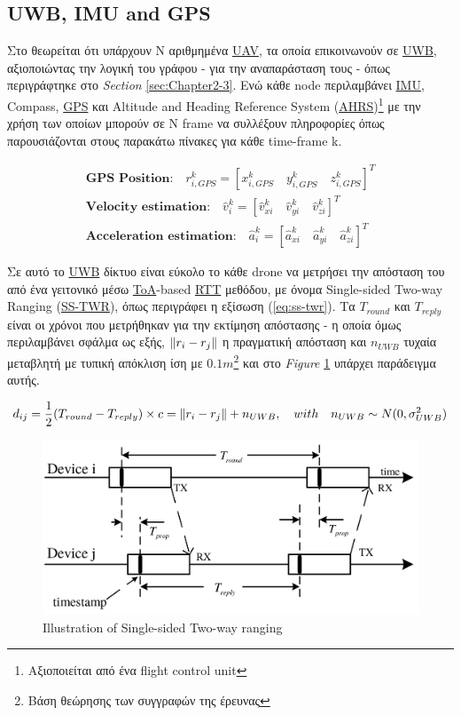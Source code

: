

\subsection{UWB, IMU and GPS}
Στο \cite{uwb-imu-gps1} θεωρείται ότι υπάρχουν Ν αριθμημένα \hyperref[abbr:UAV]{UAV}, τα οποία επικοινωνούν σε \hyperref[abbr:UWB]{UWB}, 
αξιοποιώντας την λογική του γράφου - για την αναπαράσταση τους - όπως 
περιγράφτηκε στο \emph{Section} \ref{sec:Chapter2-3}. Ενώ κάθε node περιλαμβάνει \hyperref[abbr:IMU]{IMU}, Compass, \hyperref[abbr:GPS]{GPS} και A\-lti\-tu\-de and Heading Re\-fe\-re\-nce 
System (\hyperref[abbr:AHRS]{AHRS})\footnote{Αξιοποιείται από ένα flight control unit} με την χρήση των οποίων μπορούν σε N frame να συλλέξουν 
πληροφορίες όπως παρουσιάζονται στους πα\-ρα\-κά\-τω πίνακες για κάθε time-frame k.

\begin{gather*}
	\textbf{GPS Position:}\quad r^k_{i, GPS} = \left[x^k_{i, GPS} \quad y^k_{i, GPS} \quad z^k_{i, GPS}\right]^T \\
	\textbf{Velocity estimation:}\quad\hat{v}^k_i = \left[\hat{v}^k_{xi} \quad \hat{v}^k_{yi} \quad \hat{v}^k_{zi}\right]^T \\
	\textbf{Acceleration estimation:}\quad\hat{a}^k_i = \left[\hat{a}^k_{xi} \quad \hat{a}^k_{yi} \quad \hat{a}^k_{zi}\right]^T
\end{gather*}

Σε αυτό το \hyperref[abbr:UWB]{UWB} δίκτυο είναι εύκολο το κάθε drone να μετρήσει την απόσταση του από ένα γειτονικό
μέσω \hyperref[abbr:ToA]{ToA}-based \hyperref[abbr:RTT]{RTT} μεθόδου, με όνομα Single-sided Two-way Ranging (\hyperref[abbr:SS-TWR]{SS-TWR}),
όπως περιγράφει η εξίσωση (\ref{eq:ss-twr}). Τα $T_{round}$ και $T_{reply}$ είναι
οι χρόνοι που μετρήθηκαν για την εκτίμηση απόστασης - η οποία όμως περιλαμβάνει σφάλμα ως εξής, $\left\lVert r_i - r_j\right\rVert$ η πραγματική απόσταση και $n_{UWB}$ τυχαία μεταβλητή με τυπική απόκλιση ίση με 
$0.1m$\footnote{Βάση θεώρησης των συγγραφών της έρευνας} και στο \emph{Figure} \ref{fig:SS-TWR} υπάρχει παράδειγμα αυτής.

\begin{gather}
    d_{ij} = \frac{1}{2}(T_{round} - T_{reply}) \times c = \left\lVert r_i - r_j\right\rVert + n_{UWB}, \quad with \quad n_{UWB} \sim N(0, \sigma^2_{UWB}) \label{eq:ss-twr}
\end{gather}

\begin{figure} [H]
	\centering
	\includegraphics[width=0.69
	\linewidth]{Images/Related-Work/Single-Sided-Two-Way-Ranging-SS-TWR-5.png}
	\decoRule
	\caption[Illustration of Single-sided Two-way ranging]{Illustration of Single-sided Two-way ranging \cite{uwb-imu-gps1}}
	\label{fig:SS-TWR}
\end{figure}

